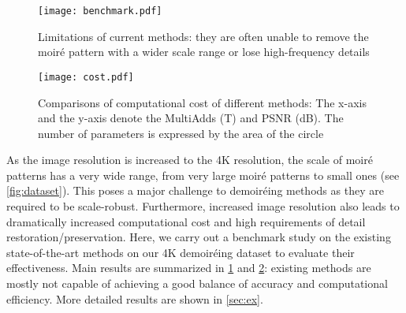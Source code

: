 \documentclass[runningheads]{llncs}
\begin{document}
\begin{figure}[t]\centering
  \texttt{[image: benchmark.pdf]}
  \caption{Limitations of current methods: they are often unable to remove the moiré pattern with a wider scale range or lose high-frequency details}
  \label{fig:fhd} 
\end{figure}

\begin{figure}[t]\centering
  \texttt{[image: cost.pdf]}
  \caption{Comparisons of computational cost of different methods: The x-axis and the y-axis denote the MultiAdds (T) and PSNR (dB). The number of parameters is expressed by the area of the circle}
  \label{fig:cost} 
\end{figure}


As the image resolution is increased to the 4K resolution, the scale of moiré patterns has a very wide range, from very large moiré patterns to small ones (see \cref{fig:dataset}). This poses a major challenge to demoiréing methods as they are required to be scale-robust. Furthermore, increased image resolution also leads to dramatically increased computational cost and high requirements of detail restoration/preservation.
Here, we carry out a benchmark study on the existing state-of-the-art methods
\cite{zheng2020image,sun2018moire,he2019mop,he2020fhde,liu2020wavelet,cheng2019multi} on our 4K demoiréing dataset to evaluate their effectiveness. Main results are summarized in \cref{fig:fhd} and \cref{fig:cost}: existing methods are mostly not capable of achieving a good balance of accuracy and computational efficiency.
More detailed results are shown in \cref{sec:ex}. 
\end{document}
